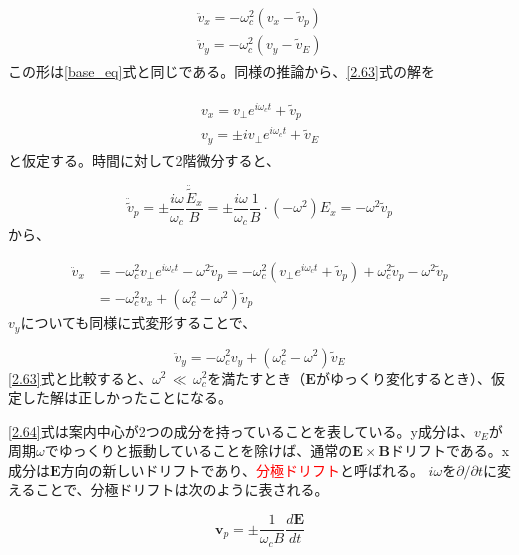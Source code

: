 \documentclass{ltjsarticle}
\numberwithin{equation}{section} %
\begin{document}
\begin{align}
  \begin{split}
    \ddot{v}_x = -\omega^2_c(v_x - \tilde{v}_p)\\
    \ddot{v}_y = -\omega^2_c(v_y - \tilde{v}_E)
  \end{split} \label{2.63}
\end{align}
この形は\eqref{base_eq}式と同じである。同様の推論から、\eqref{2.63}式の解を

\begin{align}
  \begin{split}
    v_x = v_\perp e^{i\omega_c t} + \tilde{v}_p\\
    v_y = \pm iv_\perp e^{i\omega_c t} + \tilde{v}_E
  \end{split} \label{2.64}
\end{align}
と仮定する。時間に対して2階微分すると、

\[
  \ddot{\tilde{v}}_p = \pm \frac{i\omega}{\omega_c}\frac{\ddot{\tilde{E}}_x}{B} = \pm \frac{i \omega}{\omega_c}\frac{1}{B}\cdot (-\omega^2)E_x = -\omega^2 \tilde{v}_p
\]
から、

\begin{align}
  \ddot{v}_x &= -\omega^2_c v_\perp e^{i\omega_c t} - \omega^2 \tilde{v}_p = -\omega^2_c(v_\perp e^{i\omega_c t}+\tilde{v}_p)+\omega^2_c \tilde{v}_p -\omega^2\tilde{v}_p \nonumber \\
             &= -\omega^2_c v_x + (\omega^2_c - \omega^2)\tilde{v}_p
\end{align}
$v_y$についても同様に式変形することで、

\begin{equation}
  \ddot{v}_y = -\omega^2_c v_y + (\omega^2_c - \omega^2)\tilde{v}_E
\end{equation}
\eqref{2.63}式と比較すると、$\omega^2\, \ll \, \omega^2_c$を満たすとき（$\bm{E}$がゆっくり変化するとき）、仮定した解は正しかったことになる。

\eqref{2.64}式は案内中心が2つの成分を持っていることを表している。y成分は、$v_E$が周期$\omega$でゆっくりと振動していることを除けば、通常の$\bm{E}\times\bm{B}$ドリフトである。x成分は$\bm{E}$方向の新しいドリフトであり、\textcolor{red}{分極ドリフト}と呼ばれる。
$i\omega$を$\partial/\partial t$に変えることで、分極ドリフトは次のように表される。

\begin{equation}
  \boxed{\bm{v}_p = \pm\frac{1}{\omega_c B}\frac{d\bm{E}}{dt}} \label{2.66}
\end{equation}
\end{document}
